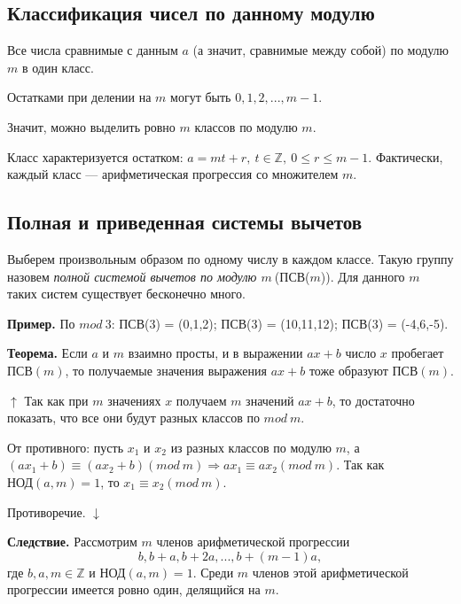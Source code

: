\documentclass{article}
\begin{document}
        \subsection{Классификация чисел по данному модулю}
        	Все числа сравнимые с данным \(a\) (а значит, сравнимые между собой) по модулю \(m\) в один класс.

            Остатками при делении на \(m\) могут быть \(0,1,2,...,m - 1\).

            Значит, можно выделить ровно \(m\) классов по модулю \(m\).

            Класс характеризуется остатком: \( a = mt + r,\ t \in \mathbb{Z},\ 0 \leq r \leq m - 1 \). Фактически, каждый класс --- арифметическая прогрессия со множителем \(m\).
            
        \subsection{Полная и приведенная системы вычетов}
        	Выберем произвольным образом по одному числу в каждом классе. Такую группу назовем \textit{полной системой вычетов по модулю \(m\ \)}(ПСВ(\(m\))). Для данного \(m\) таких систем существует бесконечно много.

            \textbf{Пример.} По \(mod\ 3\): ПСВ(3) = (0,1,2); ПСВ(3) = (10,11,12); ПСВ(3) = (-4,6,-5).
            
            \textbf{Теорема.} Если $a$ и $m$ взаимно просты, и в выражении $ax + b$ число $x$ пробегает $\textrm{ПСВ}(m)$, то получаемые значения выражения $ax + b$ тоже образуют $\textrm{ПСВ}(m)$.
            
      		$\uparrow$ Так как при $m$ значениях $x$ получаем $m$ значений $ax + b$, то достаточно показать, что все они будут разных классов по $mod\ m$.
            
            От противного: пусть $x_1$ и $x_2$ из разных классов по модулю $m$, а $(ax_1 + b) \equiv (ax_2 + b)(mod\ m) \Rightarrow ax_1 \equiv ax_2(mod\ m)$. Так как $\textrm{НОД}(a,m) = 1$, то $x_1 \equiv x_2(mod\ m)$.
            
            Противоречие. $\downarrow$
            
            \textbf{Следствие.} Рассмотрим $m$ членов арифметической прогрессии 
            \[ b, b + a, b + 2a, ..., b + (m - 1)a, \]
            где $b,a,m \in \mathbb{Z}$ и $\textrm{НОД}(a,m) = 1$. Среди $m$ членов этой арифметической прогрессии имеется ровно один, делящийся на $m$.
            
\end{document}
